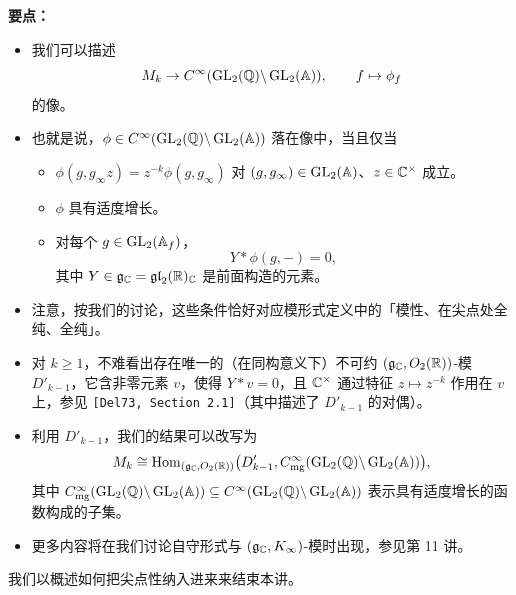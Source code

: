 \textbf{要点：}
\begin{itemize}
\item 我们可以描述
\[
M_k\to C^\infty(\operatorname{GL}_2(\mathbb{Q})\backslash\operatorname{GL}_2(\mathbb{A})),\qquad f\mapsto\phi_f
\]
的像。
\item 也就是说，$\phi\in C^\infty(\operatorname{GL}_2(\mathbb{Q})\backslash\operatorname{GL}_2(\mathbb{A}))$ 落在像中，当且仅当
\begin{itemize}
\item $\phi(g,g_\infty z)=z^{-k}\phi(g,g_\infty)$ 对 $(g,g_\infty)\in\operatorname{GL}_2(\mathbb{A})$、$z\in\mathbb{C}^\times$ 成立。
\item $\phi$ 具有适度增长。
\item 对每个 $g\in\operatorname{GL}_2(\mathbb{A}_f)$，
\[
Y*\phi(g,-)=0,
\]
其中 $Y\in\mathfrak{g}_{\mathbb{C}}=\mathfrak{gl}_2(\mathbb{R})_{\mathbb{C}}$ 是前面构造的元素。
\end{itemize}
\item 注意，按我们的讨论，这些条件恰好对应模形式定义中的「模性、在尖点处全纯、全纯」。
\item 对 $k\ge1$，不难看出存在唯一的（在同构意义下）不可约 $(\mathfrak{g}_{\mathbb{C}},O_2(\mathbb{R}))$-模 $D'_{k-1}$，它含非零元素 $v$，使得 $Y*v=0$，且 $\mathbb{C}^\times$ 通过特征 $z\mapsto z^{-k}$ 作用在 $v$ 上，参见 \texttt{[Del73, Section 2.1]}（其中描述了 $D'_{k-1}$ 的对偶）。
\item 利用 $D'_{k-1}$，我们的结果可以改写为
\[
M_k\cong\operatorname{Hom}_{(\mathfrak{g}_{\mathbb{C}},O_2(\mathbb{R}))}\bigl(D'_{k-1},C^\infty_{\mathrm{mg}}(\operatorname{GL}_2(\mathbb{Q})\backslash\operatorname{GL}_2(\mathbb{A}))\bigr),
\]
其中 $C^\infty_{\mathrm{mg}}(\operatorname{GL}_2(\mathbb{Q})\backslash\operatorname{GL}_2(\mathbb{A}))\subseteq C^\infty(\operatorname{GL}_2(\mathbb{Q})\backslash\operatorname{GL}_2(\mathbb{A}))$ 表示具有适度增长的函数构成的子集。
\item 更多内容将在我们讨论自守形式与 $(\mathfrak{g}_{\mathbb{C}},K_\infty)$-模时出现，参见第 11 讲。
\end{itemize}

我们以概述如何把尖点性纳入进来来结束本讲。

